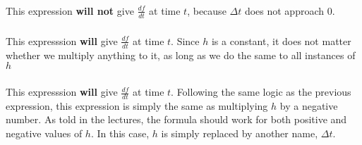 \subsubsection{}
This expression \textbf{will not} give $\frac{df}{dt}$ at time $t$, because $\Delta t$ does not approach 0.
\subsubsection{}
This expresssion \textbf{will} give $\frac{df}{dt}$ at time $t$. Since $h$ is a constant, it does not matter whether we multiply anything to it, as long as we do the same to all instances of $h$
\subsubsection{}
This expresssion \textbf{will} give $\frac{df}{dt}$ at time $t$. Following the same logic as the previous expression, this expression is simply the same as multiplying $h$ by a negative number. As told in the lectures, the formula should work for both positive and negative values of $h$. In this case, $h$ is simply replaced by another name, $\Delta t$.